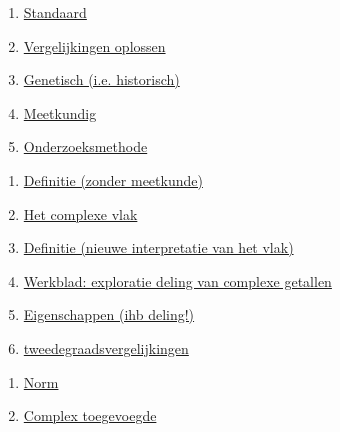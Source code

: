 \documentclass{ximera}
\begin{document}
	\author{Wim Obbels}
	\label{xim:complexe_getallen_xoverzicht}
    


    \begin{enumerate}
        \item \hyperref[xim:complexe_getallen_intro_standaard]{Standaard}
        \item \hyperref[xim:complexe_getallen_intro_vergelijkingen]{Vergelijkingen oplossen}
        \item \hyperref[xim:complexe_getallen_intro_genetisch]{Genetisch (i.e. historisch)}
        \item \hyperref[xim:complexe_getallen_intro_meetkundig]{Meetkundig}
        \item \hyperref[xim:complexe_getallen_intro_onderzoek]{Onderzoeksmethode}
    \end{enumerate}
    
    \begin{enumerate}
        \item \hyperref[xim:cmplx_definitie]{Definitie (zonder meetkunde)}
        \item \hyperref[xim:cmplx_meetkundige_interpretatie]{Het complexe vlak}
        
        \item \hyperref[xim:cmplx_definitie_meetkundig]{Definitie (nieuwe interpretatie van het vlak)}
        
        \item \hyperref[xim:cmplx_deling_dhz]{Werkblad: exploratie deling van complexe getallen}

        \item \hyperref[xim:cmplx_eigenschappen]{Eigenschappen (ihb deling!)}
        
        \item \hyperref[xim:cmplx_tweedegraadsvergelijkingen]{tweedegraadsvergelijkingen}

    \end{enumerate}

    \begin{enumerate}
        \item \hyperref[xim:complexe_getallen_norm]{Norm}
        \item \hyperref[xim:complexe_getallen_complex_toegevoegde]{Complex toegevoegde}
    \end{enumerate}
\end{document}
